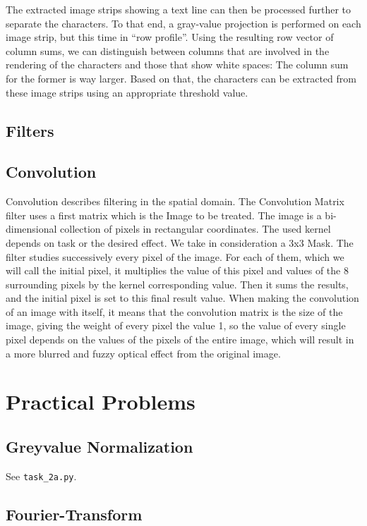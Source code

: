 \documentclass[a4paper,twocolumn]{article}
\begin{document}
	The extracted image strips showing a text line can then be processed further to separate the characters. To that end, a gray-value projection is performed on each image strip, but this time in ``row profile''. Using the resulting row vector of column sums, we can distinguish between columns that are involved in the rendering of the characters and those that show white spaces: The column sum for the former is way larger. Based on that, the characters can be extracted from these image strips using an appropriate threshold value.
	
	
	
	\subsection{Filters}
	
	\subsection{Convolution}
	
	Convolution describes filtering in the spatial domain. The Convolution Matrix  filter uses a  first matrix which is the Image to be treated. The image is a bi-dimensional collection of pixels in rectangular coordinates. The used kernel depends on task or the desired effect. We take in consideration a 3x3 Mask. The  filter studies successively every pixel of the image. For each of them, which we will call the  initial pixel, it multiplies the value of this pixel and values of the 8 surrounding pixels by the kernel corresponding value. Then it sums the results, and the initial pixel is set to this  final result value. When making the convolution of an image with itself, it means that the convolution matrix is the size of the image, giving the weight of every pixel the value 1, so the value of every single pixel depends on the values of the pixels of the entire image, which will result in a more blurred and fuzzy optical effect from the original image.
	
	\section{Practical Problems}
	
	\subsection{Greyvalue Normalization}
	
	See \texttt{task\_2a.py}.
	
	\subsection{Fourier-Transform}
	
\end{document}

